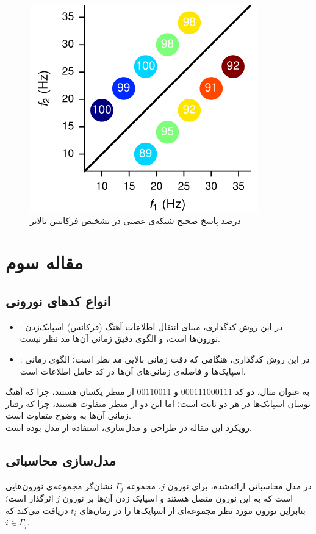 \documentclass[a4paper]{article}
\begin{document}
\begin{figure}[h!]
	\centering
	\includegraphics[scale=0.5]{fig03.png}
	\caption{درصد پاسخ صحیح شبکه‌ی عصبی در تشخیص فرکانس بالاتر}
	\label{fig03}
\end{figure}

\clearpage
\section{مقاله سوم}
\subsection{انواع کدهای نورونی}
\begin{itemize}
	\item 
	:
	 در این روش کدگذاری، مبنای انتقال اطلاعات آهنگ (فرکانس) اسپایک‌زدن نورون‌ها است، و الگوی دقیق زمانی آن‌ها مد نظر نیست.
	 \item 
	 : 
	 در این روش کدگذاری، هنگامی که دقت زمانی بالایی مد نظر است؛ الگوی زمانی اسپایک‌ها و فاصله‌ی زمانی‌های آن‌ها در کد حامل اطلاعات است. 
\end{itemize}
به عنوان مثال، دو کد $000111000111$ و $00110011$ از منظر
یکسان هستند، چرا که آهنگ نوسان اسپایک‌ها در هر دو ثابت است؛ اما این دو از منظر 
متفاوت هستند، چرا که رفتار زمانی آن‌ها به وضوح متفاوت است.\\

رویکرد این مقاله در طراحی و مدل‌سازی، استفاده از مدل 
بوده است.

\subsection{مدل‌سازی محاسباتی}
در مدل محاسباتی ارائه‌شده، برای نورون $j$، مجموعه $\Gamma_j$ نشان‌گر مجموعه‌ی نورون‌هایی است که به این نورون متصل هستند و اسپایک زدن آن‌ها بر نورون $j$ اثرگذار است؛ بنابراین نورون مورد نظر مجموعه‌ای از اسپایک‌ها را در زمان‌های $t_i$ دریافت می‌کند که $i\in\Gamma_j$.\\
\end{document}
